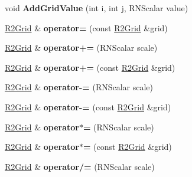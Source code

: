 \begin{DoxyCompactItemize}
\item 
void {\bfseries Add\+Grid\+Value} (int i, int j, R\+N\+Scalar value)\hypertarget{class_r2_grid_afe890811aa3948be377cef90d448020b}{}\label{class_r2_grid_afe890811aa3948be377cef90d448020b}

\item 
\hyperlink{class_r2_grid}{R2\+Grid} \& {\bfseries operator=} (const \hyperlink{class_r2_grid}{R2\+Grid} \&grid)\hypertarget{class_r2_grid_a4a313d794d0e30ff4825549da52231b1}{}\label{class_r2_grid_a4a313d794d0e30ff4825549da52231b1}

\item 
\hyperlink{class_r2_grid}{R2\+Grid} \& {\bfseries operator+=} (R\+N\+Scalar scale)\hypertarget{class_r2_grid_a0f8fe4b16c4411ab683b3117d3f4efc7}{}\label{class_r2_grid_a0f8fe4b16c4411ab683b3117d3f4efc7}

\item 
\hyperlink{class_r2_grid}{R2\+Grid} \& {\bfseries operator+=} (const \hyperlink{class_r2_grid}{R2\+Grid} \&grid)\hypertarget{class_r2_grid_a020cce55debadafe5e86e51ab252d071}{}\label{class_r2_grid_a020cce55debadafe5e86e51ab252d071}

\item 
\hyperlink{class_r2_grid}{R2\+Grid} \& {\bfseries operator-\/=} (R\+N\+Scalar scale)\hypertarget{class_r2_grid_a0df9628c0d746cd1754539991d865bb2}{}\label{class_r2_grid_a0df9628c0d746cd1754539991d865bb2}

\item 
\hyperlink{class_r2_grid}{R2\+Grid} \& {\bfseries operator-\/=} (const \hyperlink{class_r2_grid}{R2\+Grid} \&grid)\hypertarget{class_r2_grid_a0242b484d6787235de27305121d2e99f}{}\label{class_r2_grid_a0242b484d6787235de27305121d2e99f}

\item 
\hyperlink{class_r2_grid}{R2\+Grid} \& {\bfseries operator$\ast$=} (R\+N\+Scalar scale)\hypertarget{class_r2_grid_a95d1cafd1688252a1aeb8f4cd6b67889}{}\label{class_r2_grid_a95d1cafd1688252a1aeb8f4cd6b67889}

\item 
\hyperlink{class_r2_grid}{R2\+Grid} \& {\bfseries operator$\ast$=} (const \hyperlink{class_r2_grid}{R2\+Grid} \&grid)\hypertarget{class_r2_grid_aa696955204d7a82955499e4b4876d456}{}\label{class_r2_grid_aa696955204d7a82955499e4b4876d456}

\item 
\hyperlink{class_r2_grid}{R2\+Grid} \& {\bfseries operator/=} (R\+N\+Scalar scale)\hypertarget{class_r2_grid_a50cc7b84c7e46c12172c151569e815dc}{}\label{class_r2_grid_a50cc7b84c7e46c12172c151569e815dc}


\end{DoxyCompactItemize}

